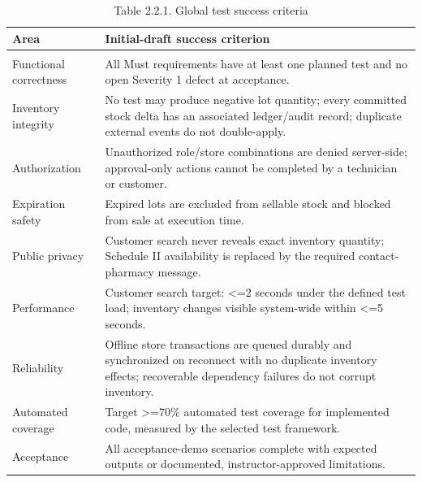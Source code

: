{\def\LTcaptype{none} %
\begin{longtable}[]{|
  >{\raggedright\arraybackslash}m{}|
  >{\raggedright\arraybackslash}m{}|}
\hline
\begin{minipage}[c]{\linewidth}\raggedright
\textbf{Area}
\end{minipage} & \begin{minipage}[c]{\linewidth}\raggedright
\textbf{Initial-draft success criterion}
\end{minipage} \\
\hline
\endhead

\caption*{Table 2.2.1. Global test success criteria}\\
\endlastfoot
Functional correctness & All Must requirements have at least one planned test and no open Severity 1 defect at acceptance. \\ \hline
Inventory integrity & No test may produce negative lot quantity; every committed stock delta has an associated ledger/audit record; duplicate external events do not double-apply. \\ \hline
Authorization & Unauthorized role/store combinations are denied server-side; approval-only actions cannot be completed by a technician or customer. \\ \hline
Expiration safety & Expired lots are excluded from sellable stock and blocked from sale at execution time. \\ \hline
Public privacy & Customer search never reveals exact inventory quantity; Schedule II availability is replaced by the required contact-pharmacy message. \\ \hline
Performance & Customer search target: \textless=2 seconds under the defined test load; inventory changes visible system-wide within \textless=5 seconds. \\ \hline
Reliability & Offline store transactions are queued durably and synchronized on reconnect with no duplicate inventory effects; recoverable dependency failures do not corrupt inventory. \\ \hline
Automated coverage & Target \textgreater=70\% automated test coverage for implemented code, measured by the selected test framework. \\ \hline
Acceptance & All acceptance-demo scenarios complete with expected outputs or documented, instructor-approved limitations. \\ \hline
\end{longtable}
}

